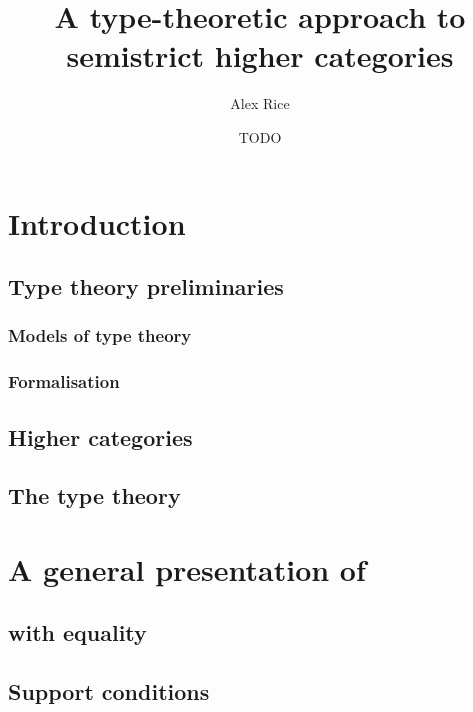 \documentclass{cam-thesis}
\title{A type-theoretic approach to semistrict higher categories}
\author{Alex Rice}
\date{TODO}
\begin{document}
\frontmatter{}



\chapter{Introduction}

\section{Type theory preliminaries}
\label{sec:type-theory}

\subsection{Models of type theory}
\label{sec:models-type-theory}

\subsection{Formalisation}
\label{sec:formalisation}



\section{Higher categories}
\label{sec:higher-categories}

\section{The type theory \Catt}
\label{sec:type-theory-catt}

\chapter{A general presentation of \Catt}
\label{cha:gener-pres-catt}

\section{\Catt with equality}
\label{sec:catt-with-equality}

\section{Support conditions}
\label{sec:support-conditions}
\end{document}
